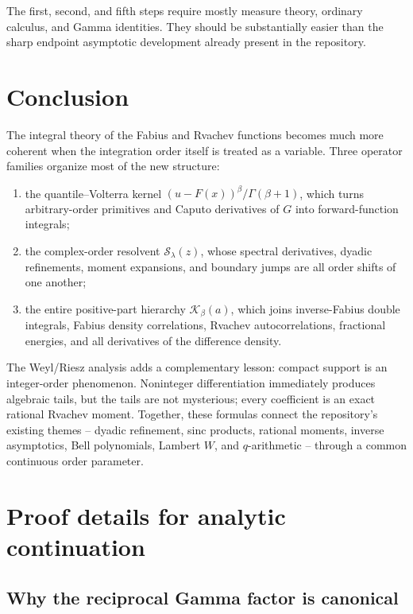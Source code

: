 \documentclass[11pt,oneside]{article}
\theoremstyle{definition}
\theoremstyle{remark}
\newcommand{\Kord}{\mathcal K}
\newcommand{\Sord}{\mathcal S}
\begin{document}
The first, second, and fifth steps require mostly measure theory, ordinary
calculus, and Gamma identities.  They should be substantially easier than the
sharp endpoint asymptotic development already present in the repository.

\section{Conclusion}
\label{sec:conclusion}

The integral theory of the Fabius and Rvachev functions becomes much more
coherent when the integration order itself is treated as a variable.  Three
operator families organize most of the new structure:

\begin{enumerate}
\item the quantile--Volterra kernel
      $(u-F(x))^\beta/\Gamma(\beta+1)$, which turns arbitrary-order
      primitives and Caputo derivatives of $G$ into forward-function
      integrals;
\item the complex-order resolvent $\Sord_\lambda(z)$, whose spectral
      derivatives, dyadic refinements, moment expansions, and boundary jumps
      are all order shifts of one another;
\item the entire positive-part hierarchy $\Kord_\beta(a)$, which joins
      inverse-Fabius double integrals, Fabius density correlations, Rvachev
      autocorrelations, fractional energies, and all derivatives of the
      difference density.
\end{enumerate}

The Weyl/Riesz analysis adds a complementary lesson: compact support is an
integer-order phenomenon.  Noninteger differentiation immediately produces
algebraic tails, but the tails are not mysterious; every coefficient is an
exact rational Rvachev moment.  Together, these formulas connect the
repository's existing themes -- dyadic refinement, sinc products, rational
moments, inverse asymptotics, Bell polynomials, Lambert $W$, and
$q$-arithmetic -- through a common continuous order parameter.

\appendix

\section{Proof details for analytic continuation}
\label{app:continuation}

\subsection{Why the reciprocal Gamma factor is canonical}
\end{document}
